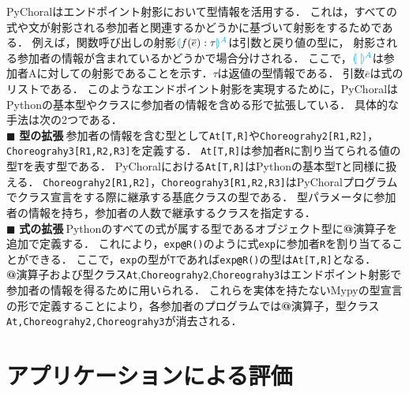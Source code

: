 \documentclass{resume}
\newcommand{\projection}[2]{{\color{cyan}\llparenthesis}#1{\color{cyan}\rrparenthesis^#2}}
\newcommand{\mblue}[1]{\textbf{\textsf{\color{MidnightBlue}#1}}}
\begin{document}
PyChoralはエンドポイント射影において型情報を活用する．
これは，すべての式や文が射影される参加者と関連するかどうかに基づいて射影をするためである．
例えば，関数呼び出しの射影$\projection{f(\overline{e}):\tau}{A}$は引数と戻り値の型に，
射影される参加者の情報が含まれているかどうかで場合分けされる．%
ここで，$\projection{~}{A}$は参加者Aに対しての射影であることを示す．$\tau$は返値の型情報である．
引数$\overline{e}$は式のリストである．
このようなエンドポイント射影を実現するために，PyChoralはPythonの基本型やクラスに参加者の情報を含める形で拡張している．
具体的な手法は次の2つである．%
\\
$\blacksquare$ \textbf{型の拡張}$~$参加者の情報を含む型として\texttt{At[T,R]}や\texttt{Choreograhy2[R1,R2]}，\texttt{Choreograhy3[R1,R2,R3]}を定義する．
\texttt{At[T,R]}は参加者\texttt{R}に割り当てられる値の型\texttt{T}を表す型である．
PyChoralにおける\texttt{At[T,R]}はPythonの基本型\texttt{T}と同様に扱える．
\texttt{Choreograhy2[R1,R2]}，\texttt{Choreograhy3[R1,R2,R3]}はPyChoralプログラムでクラス宣言をする際に継承する基底クラスの型である．
型パラメータに参加者の情報を持ち，参加者の人数で継承するクラスを指定する．
\\
$\blacksquare$ \textbf{式の拡張}$~$Pythonのすべての式が属する型であるオブジェクト型に\mblue{@}演算子を追加で定義する．
これにより，\texttt{exp\mblue{@}R()}のように式\texttt{exp}に参加者\texttt{R}を割り当てることができる．
ここで，\texttt{exp}の型が\texttt{T}であれば\texttt{exp\mblue{@}R()}の型は\texttt{At[T,R]}となる．
\\
\mblue{@}演算子および型クラス\texttt{At},\texttt{Choreograhy2},\texttt{Choreograhy3}はエンドポイント射影で参加者の情報を得るために用いられる．
これらを実体を持たないMypyの型宣言の形で定義することにより，各参加者のプログラムでは\mblue{@}演算子，型クラス\texttt{At,Choreograhy2,Choreograhy3}が消去される．%





\section{アプリケーションによる評価}
\end{document}
